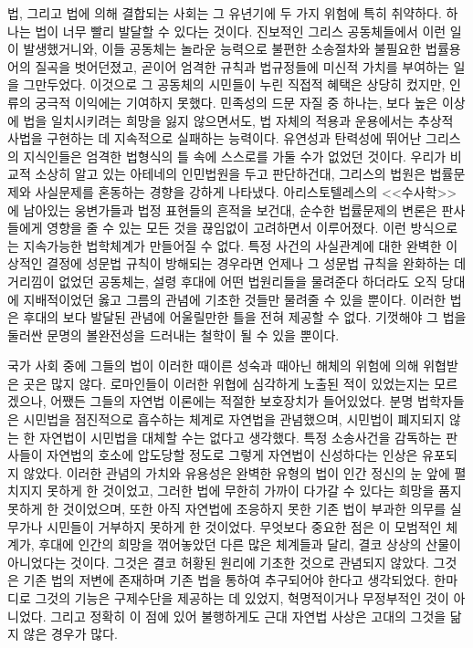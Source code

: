 법, 그리고 법에 의해 결합되는 사회는 그 유년기에
두 가지 위험에 특히 취약하다.
하나는 법이 너무 빨리 발달할 수 있다는 것이다.
진보적인 그리스 공동체들에서 이런 일이 발생했거니와,
이들 공동체는 놀라운 능력으로 불편한 소송절차와 불필요한 법률용어의
질곡을 벗어던졌고, 곧이어 엄격한 규칙과 법규정들에 미신적 가치를 부여하는 일을
그만두었다.
이것으로 그 공동체의 시민들이 누린 직접적 혜택은 상당히 컸지만,
인류의 궁극적 이익에는 기여하지 못했다.
민족성의 드문 자질 중 하나는,
보다 높은 이상에 법을 일치시키려는 희망을 잃지 않으면서도,
법 자체의 적용과 운용에서는
추상적 사법을 구현하는 데 지속적으로 실패하는 능력이다.
유연성과 탄력성에 뛰어난
그리스의 지식인들은
엄격한 법형식의 틀 속에 스스로를 가둘 수가 없었던 것이다.
우리가 비교적 소상히 알고 있는 아테네의 인민법원을 두고 판단하건대,
그리스의 법원은 법률문제와 사실문제를 혼동하는 경향을 강하게 나타냈다.
아리스토텔레스의 <<수사학>>에 남아있는
웅변가들과 법정 표현들의 흔적을 보건대,
순수한 법률문제의 변론은
판사들에게 영향을 줄 수 있는 모든 것을 끊임없이 고려하면서 이루어졌다.
이런 방식으로는 지속가능한 법학체계가 만들어질 수 없다.
특정 사건의 사실관계에 대한 완벽한 이상적인 결정에 성문법 규칙이 방해되는
경우라면 언제나 그 성문법 규칙을 완화하는 데 거리낌이 없었던 공동체는,
설령 후대에 어떤 법원리들을 물려준다 하더라도
오직 당대에 지배적이었던 옳고 그름의 관념에 기초한 것들만 물려줄 수 있을 뿐이다.
이러한 법은 후대의 보다 발달된 관념에 어울릴만한 틀을 전혀 제공할 수 없다.
기껏해야 그 법을 둘러싼 문명의 볼완전성을 드러내는 철학이 될 수 있을 뿐이다.

국가 사회 중에 그들의 법이
이러한 때이른 성숙과 때아닌 해체의 위험에 의해 위협받은 곳은 많지 않다.
로마인들이 이러한 위협에 심각하게 노출된 적이 있었는지는 모르겠으나,
어쨌든 그들의 자연법 이론에는 적절한 보호장치가 들어있었다.
분명 법학자들은 시민법을 점진적으로 흡수하는 체계로 자연법을 관념했으며,
시민법이 폐지되지 않는 한 자연법이 시민법을 대체할 수는 없다고 생각했다.
특정 소송사건을 감독하는 판사들이 자연법의 호소에 압도당할 정도로
그렇게 자연법이 신성하다는 인상은 유포되지 않았다.
이러한 관념의 가치와 유용성은 완벽한 유형의 법이 인간 정신의 눈 앞에
펼치지지 못하게 한 것이었고, 그러한 법에 무한히 가까이 다가갈 수 있다는
희망을 품지 못하게 한 것이었으며, 또한 아직 자연법에 조응하지 못한
기존 법이 부과한 의무를 실무가나 시민들이 거부하지 못하게 한 것이었다.
무엇보다 중요한 점은 이 모범적인 체계가,
후대에 인간의 희망을 꺾어놓았던 다른 많은 체계들과 달리,
결코 상상의 산물이 아니었다는 것이다.
그것은 결코 허황된 원리에 기초한 것으로 관념되지 않았다.
그것은 기존 법의 저변에 존재하며 기존 법을 통하여 추구되어야 한다고 생각되었다.
한마디로 그것의 기능은 구제수단을 제공하는 데 있었지, 혁명적이거나
무정부적인 것이 아니었다.
그리고 정확히 이 점에 있어 불행하게도 근대 자연법 사상은 고대의 그것을
닮지 않은 경우가 많다.

